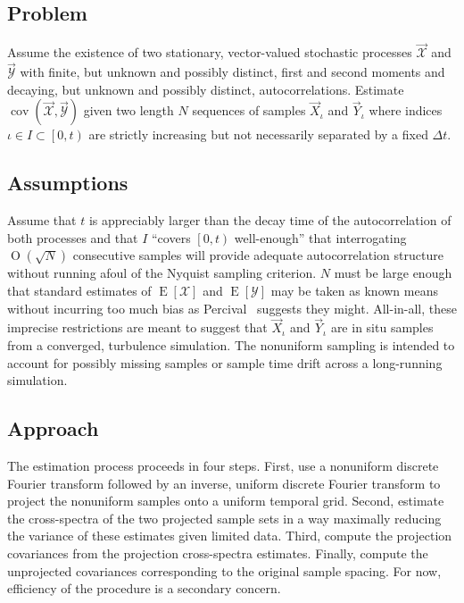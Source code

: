 \documentclass[letterpaper,11pt,nointlimits,reqno]{amsart}
\newcommand{\OO}[1]{\operatorname{O}\left(#1\right)}
\DeclareMathOperator{\cov}{cov}
\begin{document}
\subsection*{Problem}

Assume the existence of two stationary, vector-valued stochastic processes
$\vec{\mathscr{X}}$ and $\vec{\mathscr{Y}}$ with finite, but unknown and
possibly distinct, first and second moments and decaying, but unknown and
possibly distinct, autocorrelations.  Estimate
$\cov\left(\vec{\mathscr{X}},\vec{\mathscr{Y}}\right)$ given two length $N$
sequences of samples $\vec{X}_{\iota}$ and $\vec{Y}_{\iota}$ where indices
$\iota\in{}I\subset\left[0,t\right)$ are strictly increasing but not
necessarily separated by a fixed $\Delta{}t$.

\subsection*{Assumptions}

Assume that $t$ is appreciably larger than the decay time of the
autocorrelation of both processes and that $I$ ``covers $\left[0,t\right)$
well-enough'' that interrogating $\OO{\sqrt{N}}$ consecutive samples will provide
adequate autocorrelation structure without running afoul of the
Nyquist sampling criterion.  $N$ must be large enough that standard estimates
of $\operatorname{E}\left[\mathscr{X}\right]$ and
$\operatorname{E}\left[\mathscr{Y}\right]$ may be taken as known means without
incurring too much bias as Percival~\cite{Percival1993Three} suggests they
might.  All-in-all, these imprecise restrictions are meant to suggest that
$\vec{X}_\iota$ and $\vec{Y}_\iota$ are in situ samples from a converged,
turbulence simulation.  The nonuniform sampling is intended to account for
possibly missing samples or sample time drift across a long-running simulation.

\subsection*{Approach}

The estimation process proceeds in four steps.  First, use a nonuniform
discrete Fourier transform followed by an inverse, uniform discrete Fourier
transform to project the nonuniform samples onto a uniform temporal grid.
Second, estimate the cross-spectra of the two projected sample sets in a way
maximally reducing the variance of these estimates given limited data.  Third,
compute the projection covariances from the projection cross-spectra estimates.
Finally, compute the unprojected covariances corresponding to the original
sample spacing.  For now, efficiency of the procedure is a secondary concern.
\end{document}
